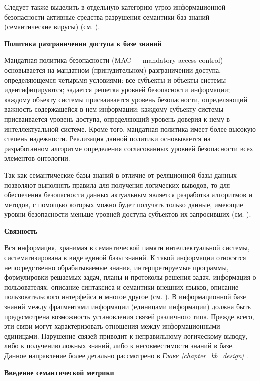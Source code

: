 Следует также выделить в отдельную категорию угроз информационной безопасности активные средства разрушения семантики баз знаний (семантические вирусы) (см. ).

\textbf{Политика разграничении доступа к базе знаний}

Мандатная политика безопасности (MAC --- mandatory access control) основывается на мандатном (принудительном) разграничении доступа, определяющемся четырьмя условиями: все субъекты и объекты системы идентифицируются; задается решетка уровней безопасности информации; каждому объекту системы присваивается уровень безопасности, определяющий важность содержащейся в нем информации; каждому субъекту системы присваивается уровень доступа, определяющий уровень доверия к нему в интеллектуальной системе. Кроме того, мандатная политика имеет более высокую степень надежности. Реализация данной политики основывается на разработанном алгоритме определения согласованных уровней безопасности всех элементов онтологии.

Так как семантические базы знаний в отличие от реляционной базы данных позволяют выполнять правила для получения логических выводов, то для обеспечения безопасности данных актуальным является разработка алгоритмов и методов, с помощью которых можно будет получать только данные, имеющие уровни безопасности меньше уровней доступа субъектов их запросивших (см. ).

\textbf{Связность}

Вся информация, хранимая в семантической памяти интеллектуальной системы, систематизирована в виде единой базы знаний. К такой информации относятся непосредственно обрабатываемые знания, интерпретируемые программы, формулировки решаемых задач, планы и протоколы решения задач, информация о пользователях, описание синтаксиса и семантики внешних языков, описание пользовательского интерфейса и многое другое (см. ). В информационной базе знаний между фрагментами информации (единицами информации) должна быть предусмотрена возможность установления связей различного типа. Прежде всего, эти связи могут характеризовать отношения между информационными единицами. Нарушение связей приводит к неправильному логическому выводу, либо к получению ложных знаний, либо к несовместимости знаний в базе. Данное направление более детально рассмотрено в \textit{Главе \ref{chapter_kb_design} }.

\textbf{Введение семантической метрики}

